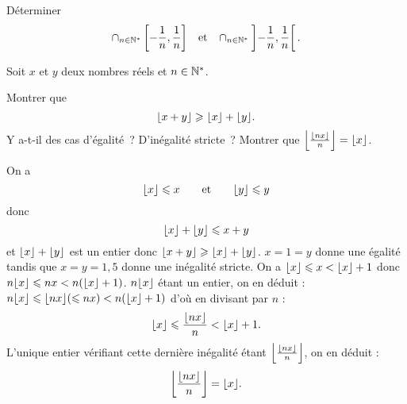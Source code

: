 \documentclass{magnolia}
\begin{document}
Déterminer 
\[\cap_{n\in{\mathbb{N}^*}}\left[-\frac{1}{n},\frac{1}{n}\right] \quad\!\text{et}\quad\!
  \cap_{n\in{\mathbb{N}^*}}\left]-\frac{1}{n},\frac{1}{n}\right[.\]

Soit $x$ et $y$ deux nombres réels et $n\in{\mathbb{N}^*}$.
\begin{questions}
\question Montrer que
  \[\ent{x+y}\geq \ent{x}+ \ent{y}.\]
  Y a-t-il des cas d'égalité~? D'inégalité stricte~?
\question Montrer que $\left\lfloor\frac{\left\lfloor nx\right\rfloor}{n}\right\rfloor=\left\lfloor x\right\rfloor$.
\end{questions}
\begin{sol}
\begin{questions}
\question On a $$\ent{x}\leq x \qquad \text{et} \qquad \ent{y}\leq y $$ donc $$\left\lfloor x\right\rfloor+\left\lfloor y\right\rfloor\leqslant x+y$$ et $\left\lfloor x\right\rfloor+\left\lfloor y\right\rfloor$ est un entier donc $\left\lfloor x+y\right\rfloor\geqslant \left\lfloor x\right\rfloor+\left\lfloor y\right\rfloor$.
$x=1=y$ donne une égalité tandis que $x=y=1,5$ donne une inégalité stricte.
\question On a $\left\lfloor x\right\rfloor\leqslant x <\left\lfloor x\right\rfloor+1$ donc $n\ent{x}\leq nx <n(\ent{x}+1)$. $n\ent{x}$ étant un entier, on en déduit : $n\ent{x}\leq \ent{nx}(\leq nx) <n(\ent{x}+1)$ d'où en divisant par $n$ :
$$\left\lfloor x\right\rfloor\leqslant \frac{\left\lfloor nx\right\rfloor}{n} <\left\lfloor x\right\rfloor+1.$$ L'unique entier vérifiant cette dernière inégalité étant $\left\lfloor\frac{\left\lfloor nx\right\rfloor}{n}\right\rfloor$, on en déduit :
$$\ent{\frac{\ent{nx}}{n}}=\ent{x}.$$
\end{questions}
\end{sol}
\end{document}
